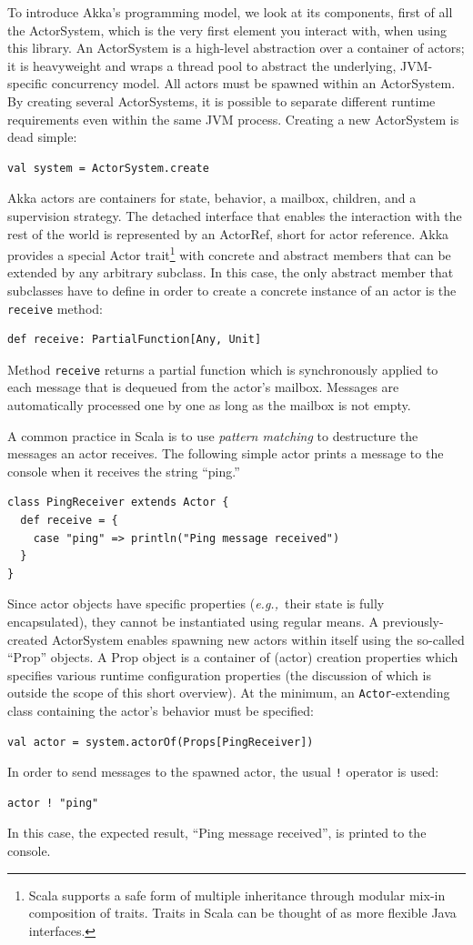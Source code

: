 \documentclass{sig-alternate}
\newcommand{\eg}{{\em e.g.,~}}
\begin{document}
To introduce Akka's programming model, we look at its components, first of all the ActorSystem, which is the very first element you interact with, when using this library.
An ActorSystem is a high-level abstraction over a container of actors; it is heavyweight and wraps a thread pool to abstract the underlying, JVM-specific concurrency model.
All actors must be spawned within an ActorSystem. By creating several ActorSystems, it is possible to separate different runtime requirements even within the same JVM process.
Creating a new ActorSystem is dead simple:
\begin{lstlisting}
val system = ActorSystem.create
\end{lstlisting}
\noindent
Akka actors are containers for state, behavior, a mailbox, children, and a supervision strategy. The detached interface that enables the interaction with the rest of the world is represented by an ActorRef, short for actor reference.
Akka provides a special Actor trait\footnote{Scala supports a safe form of multiple inheritance through modular mix-in composition of traits. Traits in Scala can be thought of as more flexible Java interfaces.} with concrete and abstract members that can be extended by any arbitrary subclass.
In this case, the only abstract member that subclasses have to define in order to create a concrete instance of an actor is the \verb|receive| method:
\begin{lstlisting}
def receive: PartialFunction[Any, Unit]
\end{lstlisting}
\noindent
Method \verb|receive| returns a partial function which is synchronously applied to each message that is dequeued from the actor's mailbox. Messages are automatically processed one by one as long as the mailbox is not empty.

A common practice in Scala is to use {\em pattern matching} to destructure the messages an actor receives. The following simple actor prints a message to the console when it receives the string ``ping.''
\begin{lstlisting}
class PingReceiver extends Actor {
  def receive = {
    case "ping" => println("Ping message received")
  }
}
\end{lstlisting}
\noindent
Since actor objects have specific properties (\eg their state is fully encapsulated), they cannot be instantiated using regular means. A previously-created ActorSystem enables spawning new actors within itself using the so-called ``Prop'' objects. A Prop object is a container of (actor) creation properties which specifies various runtime configuration properties (the discussion of which is outside the scope of this short overview). At the minimum, an \verb|Actor|-extending class containing the actor's behavior must be specified:
\begin{lstlisting}
val actor = system.actorOf(Props[PingReceiver])
\end{lstlisting}
\noindent
In order to send messages to the spawned actor, the usual \verb|!| operator is used:
\begin{lstlisting}
actor ! "ping"
\end{lstlisting}
\noindent
In this case, the expected result, ``Ping message received'', is printed to the console.
\end{document}
